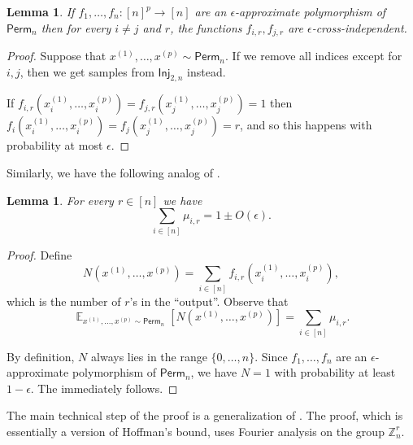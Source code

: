 \documentclass{article}
\providecommand{\Inj}{\mathsf{Inj}}
\providecommand{\Perm}{\mathsf{Perm}}
\DeclareMathOperator*{\Ex}{\mathbb{E}}
\newtheorem{lemma}[theorem]{Lemma}
\theoremstyle{definition}
\theoremstyle{remark}
\begin{document}
\begin{lemma}
\label{lem:approx-cross-independent}
If $f_1,\dots,f_n\colon [n]^p \to [n]$ are an $\epsilon$-approximate polymorphism of $\Perm_n$ then for every $i \neq j$ and $r$, the functions $f_{i,r},f_{j,r}$ are $\epsilon$-cross-independent.
\end{lemma}
\begin{proof}
Suppose that $x^{(1)},\dots,x^{(p)} \sim \Perm_n$. If we remove all indices except for $i,j$, then we get samples from $\Inj_{2,n}$ instead.

If $f_{i,r}(x^{(1)}_i,\dots,x^{(p)}_i) = f_{j,r}(x^{(1)}_j,\dots,x^{(p)}_j) = 1$ then $f_i(x^{(1)}_i,\dots,x^{(p)}_i) = f_j(x^{(1)}_j,\dots,x^{(p)}_j) = r$, and so this happens with probability at most $\epsilon$.
\end{proof}

Similarly, we have the following analog of .

\begin{lemma} \label{lem:i-sum}
For every $r \in [n]$ we have
\[
 \sum_{i \in [n]} \mu_{i,r} = 1 \pm O(\epsilon).
\]
\end{lemma}
\begin{proof}
Define
\[
 N(x^{(1)},\dots,x^{(p)}) = \sum_{i \in [n]} f_{i,r}(x^{(1)}_i,\dots,x^{(p)}_i),
\]
which is the number of $r$'s in the ``output''. Observe that
\[
 \Ex_{x^{(1)},\dots,x^{(p)} \sim \Perm_n}[N(x^{(1)},\dots,x^{(p)})] = \sum_{i \in [n]} \mu_{i,r}.
\]

By definition, $N$ always lies in the range $\{0,\dots,n\}$. Since $f_1,\dots,f_n$ are an $\epsilon$-approximate polymorphism of $\Perm_n$, we have $N = 1$ with probability at least $1-\epsilon$. The  immediately follows.
\end{proof}

The main technical step of the proof is a generalization of . The proof, which is essentially a version of Hoffman's bound, uses Fourier analysis on the group $\mathbb{Z}_n^r$.
\end{document}
